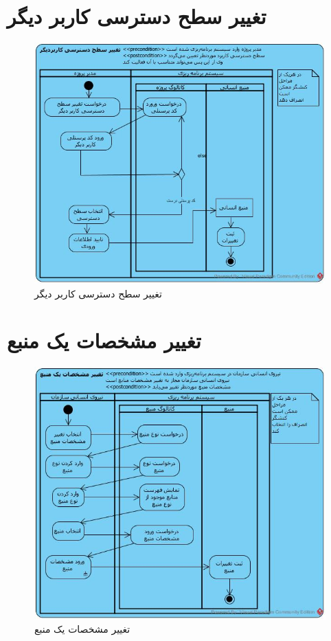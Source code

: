\section{تغییر سطح دسترسی کاربر دیگر}
\begin{figure}[H]
	\centering
	\includegraphics[scale=0.6]{img/activity/ChangeAccessLevel}
	\caption{تغییر سطح دسترسی کاربر دیگر}
\end{figure}


\section{تغییر مشخصات یک منبع}
\begin{figure}[H]
	\centering
	\includegraphics[scale=0.6]{img/activity/EditResourceAttributes}
	\caption{تغییر مشخصات یک منبع}
\end{figure}




